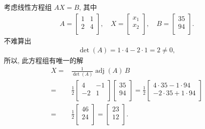 \begin{example}
    考虑线性方程组 \(AX = B\),
    其中
    \begin{align*}
        A = \begin{bmatrix}
                1 & 1 \\
                2 & 4 \\
            \end{bmatrix},
        \quad
        X =
        \begin{bmatrix}
            x_1 \\
            x_2 \\
        \end{bmatrix},
        \quad
        B =
        \begin{bmatrix}
            35 \\
            94 \\
        \end{bmatrix}.
    \end{align*}
    不难算出
    \begin{align*}
        \det {(A)} = 1 \cdot 4 - 2 \cdot 1 = 2 \neq 0,
    \end{align*}
    所以, 此方程组有唯一的解
    \begin{align*}
        X
        = {} &
        \frac{1}{\det {(A)}} \operatorname{adj} {(A)}\,B
        \\
        = {} &
        \frac{1}{2}
        \begin{bmatrix}
            4  & -1 \\
            -2 & 1  \\
        \end{bmatrix}
        \begin{bmatrix}
            35 \\
            94 \\
        \end{bmatrix}
        =
        \frac{1}{2}
        \begin{bmatrix}
            4 \cdot 35 - 1 \cdot 94  \\
            -2 \cdot 35 + 1 \cdot 94 \\
        \end{bmatrix}
        \\
        = {} &
        \frac{1}{2}
        \begin{bmatrix}
            46 \\
            24 \\
        \end{bmatrix}
        =
        \begin{bmatrix}
            23 \\
            12 \\
        \end{bmatrix}.
    \end{align*}
\end{example}

